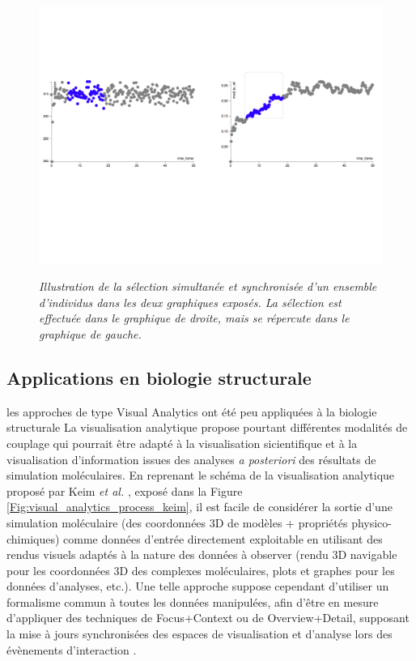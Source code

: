\begin{figure}
  \centering
  {\includegraphics[width=.75\linewidth]{./figures/ch2/ch2_focus+context}}
    \caption[Illustration de la sélection simultanée et synchronisée d'un ensemble d'individus dans deux graphiques]{{\it Illustration de la sélection simultanée et synchronisée d'un ensemble d'individus dans les deux graphiques exposés. La sélection est effectuée dans le graphique de droite, mais se répercute dans le graphique de gauche.}}
  \label{Fig:focus+context}
  \hspace{0.3cm}
\end{figure}


\subsection{Applications en biologie structurale}
\label{Sec:visuAnalyticsStructBio}


les approches de type Visual Analytics ont été peu appliquées à la biologie structurale  %
La visualisation analytique propose pourtant différentes modalités de couplage  qui pourrait être adapté à la visualisation sicientifique et à la visualisation d'information issues des analyses \textit{a posteriori} des résultats de simulation moléculaires. En reprenant le schéma de la visualisation analytique proposé par Keim \textit{et al.} \cite{keim2010mastering}, exposé dans la Figure \ref{Fig:visual_analytics_process_keim}, il est facile de considérer la sortie d'une simulation moléculaire (des coordonnées 3D de modèles + propriétés physico-chimiques) comme données d'entrée directement exploitable en utilisant des rendus visuels adaptés à la nature des données à observer (rendu 3D navigable pour les coordonnées 3D des complexes moléculaires, plots et graphes pour les données d'analyses, etc.). Une telle approche suppose cependant d'utiliser un formalisme commun à toutes les données manipulées, afin d'être en mesure d'appliquer des techniques de Focus+Context ou de Overview+Detail, supposant la mise à jours synchronisées des espaces de visualisation et d'analyse lors des évènements d'interaction \cite{schulz2011visual,kerren_toward_2012}.

